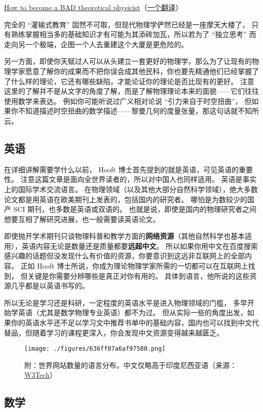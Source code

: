 \href{https://webspace.science.uu.nl/~hooft101/theoristbad.html#:~:text=On\%20your\%20way\%20towards\%20becoming,have\%20your\%20work\%20published\%20anyway.}{How to become a BAD theoretical physicist}（\href{https://zhuanlan.zhihu.com/p/38680467}{一个翻译}）

完全的 “灌输式教育” 固然不可取，但现代物理学俨然已经是一座摩天大楼了， 只有熟练掌握相当多的基础知识才有可能为其添砖加瓦，所以若为了 “独立思考” 而走向另一个极端，企图一个人去重建这个大厦是更危险的。

另一方面，即使你天赋过人可以从头建立一套更好的物理学，那么为了让现有的物理学家愿意了解你的成果而不把你误会成其他民科，你也要先精通他们已经掌握了了什么样的理论，它还有哪些缺陷，才能论证你的理论是否比现有的更好。 注意这里的了解并不是从文字的角度了解，而是了解物理理论本来的面貌——它们往往使用数学来表达。 例如你可能听说过广义相对论说 “引力来自于时空扭曲”， 但如果你不知道描述时空扭曲的数学描述——黎曼几何的度量张量，那这句话就不知所云。

\subsection{英语}
在详细讲解需要学什么以前， Hooft 博士首先提到的就是英语，可见英语的重要性。 注意这篇文章是面向全世界读者的，所以对中国人也同样适用。 英语是事实上的国际学术交流语言。 在物理领域（以及其他大部分自然科学领域），绝大多数论文都是用英语在欧美期刊上发表的，包括国内的研究者。 哪怕是为数较少的国产 SCI 期刊，也多数是英语或双语的。 也就是说，即使是国内的物理研究者之间想要互相了解研究进展，也一般需要读英语论文。

即使抛开学术期刊只谈物理科普和教学方面的\textbf{网络资源}（其他自然科学也基本适用），英语内容无论是数量还是质量都要\textbf{远超中文}。 所以如果你用中文在百度搜索感兴趣的话题但没发现什么有价值的资源，你要意识到这远非互联网上的全部内容。 正如 Hooft 博士所说，你成为理论物理学家所需的一切都可以在互联网上找到， 但关键是你需要分辨哪些是真正对你有用的。 具体到语言，他所说的这些资源几乎都是以英语书写的。

所以无论是学习还是科研，一定程度的英语水平是进入物理领域的门槛， 多早开始学英语（尤其是数学物理专业英语）都不为过。 但从实际一些的角度出发，如果你的英语水平还不足以学习文中推荐书单中的基础内容，国内也可以找到中文代替品，但随着学习的课程更深入，你会发现中文资源变得越来越匮乏。

\begin{figure}[ht]
\centering
\texttt{[image: ./figures/636ff07a6af97580.png]}
\caption{附：世界网站数量的语言分布，中文仅略高于印度尼西亚语（来源：\href{https://w3techs.com/technologies/overview/content_language}{W3Tech}）} \label{fig_SdyPhy_2}
\end{figure}

\subsection{数学}
